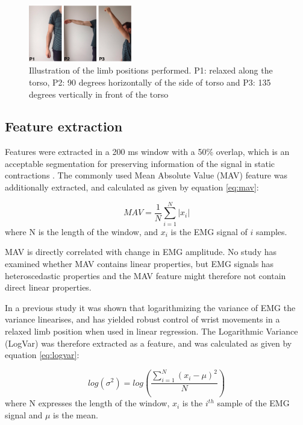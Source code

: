 \begin{figure}[thpb]
	\centering
	\includegraphics[width=0.4\textwidth]{Figures/limb_pos}  %
	\caption{Illustration of the limb positions performed. P1: relaxed along the torso, P2: 90 degrees horizontally of the side of torso and P3: 135 degrees vertically in front of the torso}
	\label{fig:limbpositions}  %
\end{figure}

\subsection{Feature extraction}
Features were extracted in a 200 ms window with a 50\% overlap, which is an acceptable segmentation for preserving information of the signal in static contractions \cite{Farfan2010}.
The commonly used Mean Absolute Value (MAV) feature was additionally extracted, and calculated as given by equation \ref{eq:mav}: \cite{Zecca2002} 

\begin{equation} \label{eq:mav}
MAV = \frac{1}{N}\sum\limits_{i=1}^N|x_i|
\end{equation}
where N is the length of the window, and $x_i$ is the EMG signal of $i$ samples.

MAV is directly correlated with change in EMG amplitude. No study has examined whether MAV contains linear properties, but EMG signals has heteroscedastic properties \cite{rasool2012} and the MAV feature might therefore not contain direct linear properties.

In a previous study \cite{hahne2014} it was shown that logarithmizing the variance of EMG the variance linearises, and has yielded robust control of wrist movements in a relaxed limb position when used in linear regression. The Logarithmic Variance (LogVar) was therefore extracted as a feature, and was calculated as given by equation \ref{eq:logvar}:

\begin{equation} \label{eq:logvar}
log(\sigma^2) = log(\frac{\sum\limits_{i=1}^N(x_i - \mu)^2}{N})
\end{equation}
where N expresses the length of the window, $x_i$ is the $i^{th}$ sample of the EMG signal and $\mu$ is the mean.

